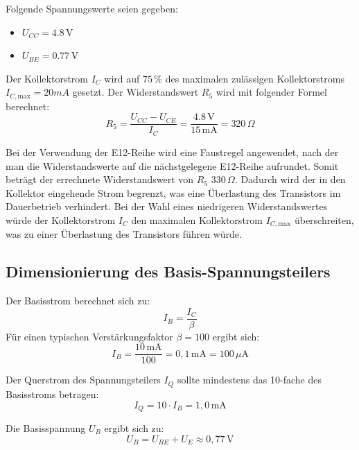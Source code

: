  Folgende Spannungswerte seien gegeben:
 \begin{itemize}
     \item $U_{CC} = 4.8\,\mathrm{V}$
     \item $U_{BE} = 0.77\,\mathrm{V}$
 \end{itemize}

 Der Kollektorstrom $I_C$ wird auf $75\,\%$ des maximalen zulässigen Kollektorstroms \\$I_{C,\mathrm{max}} =20mA$  gesetzt. 
 Der Widerstandswert $R_5$ wird mit folgender Formel berechnet:
 \begin{equation}
     R_5 = \frac{U_{CC} - U_{CE}}{I_C} = \frac{4.8\,\mathrm{V}}{15\,\mathrm{mA}} = 320\,\Omega
 \end{equation}

 Bei der Verwendung der E12-Reihe wird eine Faustregel angewendet, nach der man die Widerstandswerte auf die nächstgelegene E12-Reihe aufrundet. 
 Somit beträgt der errechnete Widerstandswert von $R_5$ 330\,\(\Omega\). Dadurch wird der in den Kollektor eingehende Strom begrenzt, was eine Überlastung des Transistors im Dauerbetrieb verhindert. 
 Bei der Wahl eines niedrigeren Widerstandswertes würde der Kollektorstrom $I_C$ den maximalen Kollektorstrom $I_{C,\mathrm{max}}$ überschreiten, was zu einer Überlastung des Transistors führen würde.

\subsection{Dimensionierung des Basis-Spannungsteilers}
Der Basisstrom berechnet sich zu:
 \begin{equation}
     I_B = \frac{I_C}{\beta}
 \end{equation}
 Für einen typischen Verstärkungsfaktor $\beta = 100$ ergibt sich:
 \begin{equation}
     I_B = \frac{10\,\mathrm{mA}}{100} = 0{,}1\,\mathrm{mA} = 100\,\mu\mathrm{A}
 \end{equation}

 Der Querstrom des Spannungsteilers $I_Q$ sollte mindestens das 10-fache des Basisstroms betragen:
 \begin{equation}
     I_Q = 10 \cdot I_B = 1{,}0\,\mathrm{mA}
 \end{equation}

 Die Basisspannung $U_B$ ergibt sich zu:
 \begin{equation}
     U_B = U_{BE} + U_E \approx 0{,}77\,\mathrm{V}
 \end{equation}

